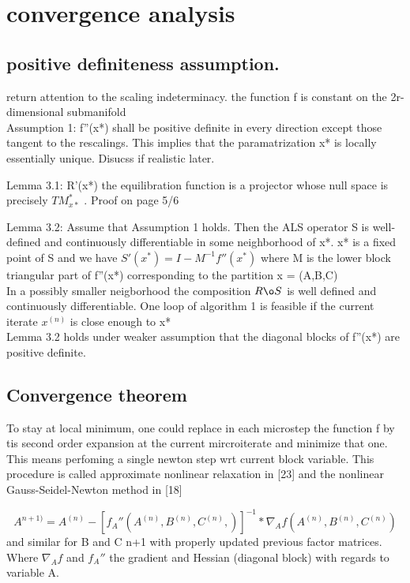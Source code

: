 \documentclass[10pt, draft]{article}
\begin{document}
  \section{convergence analysis}
  
  \subsection{positive definiteness assumption.}
  
  return attention to the scaling indeterminacy.  the function f is constant on the 2r-dimensional submanifold\\
  Assumption 1: f''(x*) shall be positive definite in every direction except those tangent to the rescalings.  This implies that the paramatrization x* is locally essentially unique. Disucss if realistic later.  \linebreak[1]
  
  Lemma 3.1:  R'(x*) the equilibration function is a projector whose null space is precisely $TM^*_{x*}$ . Proof on page 5/6\linebreak[1]
  
  Lemma 3.2: Assume that Assumption 1 holds.  Then the ALS operator S is well-defined and continuously differentiable in some neighborhood of x*.  x* is a fixed point of S and we have $S'(x^*) = I - M^{-1}f''(x^*)$ where M is the lower block triangular part of f''(x*) corresponding to the partition x = (A,B,C)\\
  In a possibly smaller neigborhood the composition $R\o S$ is well defined and continuously differentiable.  One loop of algorithm 1 is feasible if the current iterate $x^{(n)}$ is close enough to x*\\
  Lemma 3.2 holds under weaker assumption that the diagonal blocks of f''(x*) are positive definite.  
  
  \subsection{Convergence theorem}
  
  To stay at local minimum, one could replace in each microstep the function f by tis second order expansion at the current mircroiterate and minimize that one.  This means perfoming a single newton step wrt current block variable. This procedure is called approximate nonlinear relaxation in [23] and the nonlinear Gauss-Seidel-Newton method in [18]
  
  \[A^{n+1)} = A^{(n)} - [f_A''(A^{(n)},B^{(n)} ,C^{(n)},)]^{-1} * \nabla_A f(A^{(n)},B^{(n)},C^{(n)})\]
  and similar for B and C n+1 with properly updated previous factor matrices.\\
  Where $\nabla_Af$ and $f_A''$ the gradient and Hessian (diagonal block) with regards to variable A.  \linebreak[1]
  
\end{document}
